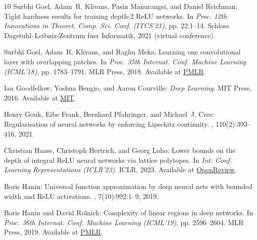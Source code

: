 \begin{thebibliography}{10}
{\sc Surbhi Goel, Adam~R. Klivans, Pasin Manurangsi, and Daniel Reichman}:
  Tight hardness results for training depth-2 {ReLU} networks.
\newblock In {\em Proc. 12th Innovations in Theoret. Comp. Sci. Conf.
  (ITCS'21)}, pp. 22:1--14. Schloss Dagstuhl--Leibniz-Zentrum fuer Informatik,
  2021 (virtual conference).

{\sc Surbhi Goel, Adam~R. Klivans, and Raghu Meka}: Learning one convolutional
  layer with overlapping patches.
\newblock In {\em Proc. 35th Internat. Conf. Machine Learning (ICML'18)}, pp.
  1783--1791. MLR Press, 2018.
\newblock Available at
  \href{https://proceedings.mlr.press/v80/goel18a.html}{PMLR}.

{\sc Ian Goodfellow, Yoshua Bengio, and Aaron Courville}: {\em Deep Learning}.
\newblock MIT Press, 2016.
\newblock Available at \href{http://www.deeplearningbook.org}{MIT}.

{\sc Henry Gouk, Eibe Frank, Bernhard Pfahringer, and Michael~J. Cree}:
  Regularisation of neural networks by enforcing {L}ipschitz continuity.
, 110(2):393--416, 2021.
\newblock [\epfmtdoi{10.1007/s10994-020-05929-w}]

{\sc Christian Haase, Christoph Hertrich, and Georg Loho}: Lower bounds on the
  depth of integral {ReLU} neural networks via lattice polytopes.
\newblock In {\em Int. Conf. Learning Representations (ICLR'23)}. ICLR, 2023.
\newblock Available at
  \href{https://openreview.net/forum?id=2mvALOAWaxY}{OpenReview}.

{\sc Boris Hanin}: Universal function approximation by deep neural nets with
  bounded width and {ReLU} activations.
, 7(10):992:1--9, 2019.

{\sc Boris Hanin and David Rolnick}: Complexity of linear regions in deep
  networks.
\newblock In {\em Proc. 36th Internat. Conf. Machine Learning (ICML'19)}, pp.
  2596--2604. MLR Press, 2019.
\newblock Available at
  \href{https://proceedings.mlr.press/v97/hanin19a.html}{PMLR}.


\end{thebibliography}
